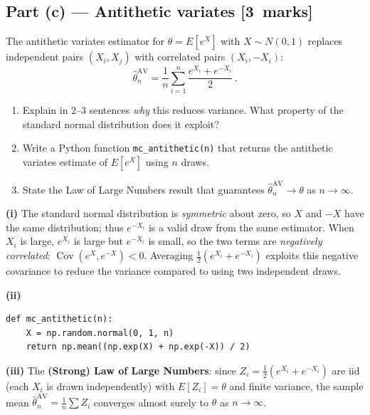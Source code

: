 \documentclass[11pt,a4paper]{article}
\newcommand{\mkpts}[1]{\hfill\textbf{[#1~marks]}}
\begin{document}
\subsection*{Part (c) --- Antithetic variates \mkpts{3}}

The antithetic variates estimator for $\theta = E[e^X]$ with $X\sim N(0,1)$ replaces independent pairs $(X_i, X_j)$ with correlated pairs $(X_i, -X_i)$:
\[
\hat{\theta}_n^{\text{AV}} = \frac{1}{n}\sum_{i=1}^{n}\frac{e^{X_i}+e^{-X_i}}{2}\,.
\]

\begin{enumerate}[label=(\roman*),nosep]
\item Explain in 2--3 sentences \emph{why} this reduces variance.  What property of the standard normal distribution does it exploit?
\item Write a Python function \texttt{mc\_antithetic(n)} that returns the antithetic variates estimate of $E[e^X]$ using $n$ draws.
\item State the Law of Large Numbers result that guarantees $\hat{\theta}_n^{\text{AV}} \to \theta$ as $n\to\infty$.
\end{enumerate}

\begin{solution}
\textbf{(i)} The standard normal distribution is \emph{symmetric} about zero, so $X$ and $-X$ have the same distribution; thus $e^{-X_i}$ is a valid draw from the same estimator.  When $X_i$ is large, $e^{X_i}$ is large but $e^{-X_i}$ is small, so the two terms are \emph{negatively correlated}: $\operatorname{Cov}(e^{X}, e^{-X}) < 0$.  Averaging $\tfrac{1}{2}(e^{X_i} + e^{-X_i})$ exploits this negative covariance to reduce the variance compared to using two independent draws.

\medskip

\textbf{(ii)}
\begin{lstlisting}[numbers=none]
def mc_antithetic(n):
    X = np.random.normal(0, 1, n)
    return np.mean((np.exp(X) + np.exp(-X)) / 2)
\end{lstlisting}

\textbf{(iii)} The \textbf{(Strong) Law of Large Numbers}: since $Z_i = \tfrac{1}{2}(e^{X_i}+e^{-X_i})$ are iid (each $X_i$ is drawn independently) with $E[Z_i] = \theta$ and finite variance, the sample mean $\hat{\theta}_n^{\text{AV}} = \tfrac{1}{n}\sum Z_i$ converges almost surely to $\theta$ as $n\to\infty$.
\end{solution}


\newpage
\end{document}
